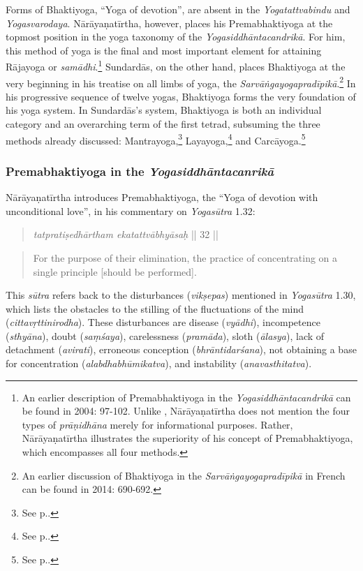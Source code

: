 Forms of Bhaktiyoga, ``Yoga of devotion'', are absent in the \textit{Yogatattvabindu} and \textit{Yogasvarodaya}. Nārāyaṇatīrtha, however, places his Premabhaktiyoga at the topmost position in the yoga taxonomy of the \textit{Yogasiddhāntacandrikā}. For him, this method of yoga is the final and most important element for attaining Rājayoga or \textit{samādhi}.\footnote{An earlier description of Premabhaktiyoga in the \textit{Yogasiddhāntacandrikā} can be found in \citeauthor{penna2004} 2004: 97-102. Unlike \citeauthor{penna2004}, Nārāyaṇatīrtha does not mention the four types of \textit{prāṇidhāna} merely for informational purposes. Rather, Nārāyaṇatīrtha illustrates the superiority of his concept of Premabhaktiyoga, which encompasses all four methods.} Sundardās, on the other hand, places Bhaktiyoga at the very beginning in his treatise on all limbs of yoga, the \textit{Sarvāṅgayogapradīpikā}.\footnote{An earlier discussion of Bhaktiyoga in the \textit{Sarvāṅgayogapradīpikā} in French can be found in \citeauthor{burger2014sarvangayogapradipika} 2014: 690-692.} In his progressive sequence of twelve yogas, Bhaktiyoga forms the very foundation of his yoga system. In Sundardās's system, Bhaktiyoga is both an individual category and an overarching term of the first tetrad, subsuming the three methods already discussed: Mantrayoga,\footnote{See p.\pageref{mantrayogaintrosarva}.} Layayoga,\footnote{See p.\pageref{layaintrosarvanga}.} and Carcāyoga.\footnote{See p.\pageref{carcasarvanga}.}

\subsubsection{Premabhaktiyoga in the \emph{Yogasiddhāntacanrikā}}
\label{premabhaktiyoga}

Nārāyaṇatīrtha introduces Premabhaktiyoga, the ``Yoga of devotion with unconditional love'', in his commentary on \textit{Yogasūtra} 1.32:
\begin{quote}
  \textit{tatpratiṣedhārtham ekatattvābhyāsaḥ} || 32 ||
\end{quote}
\begin{quote}
For the purpose of their elimination, the practice of concentrating on a single principle [should be performed].
\end{quote}

This \textit{sūtra} refers back to the disturbances (\textit{vikṣepas}) mentioned in \textit{Yogasūtra} 1.30, which lists the obstacles to the stilling of the fluctuations of the mind (\textit{cittavṛttinirodha}). These disturbances are disease (\textit{vyādhi}), incompetence (\textit{sthyāna}), doubt (\textit{saṃśaya}), carelessness (\textit{pramāda}), sloth (\textit{ālasya}), lack of detachment (\textit{avirati}), erroneous conception (\textit{bhrāntidarśana}), not obtaining a base for concentration (\textit{alabdhabhūmikatva}), and instability (\textit{anavasthitatva}).


